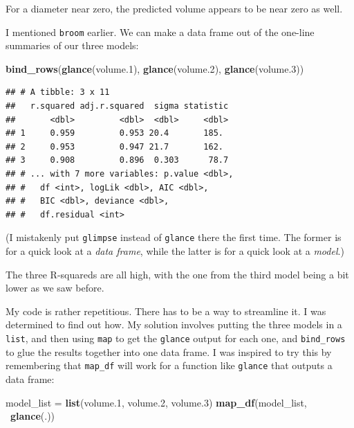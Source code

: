 \documentclass[]{tufte-book}
\newenvironment{Shaded}{}{}
\newcommand{\FloatTok}[1]{\textcolor[rgb]{0.25,0.63,0.44}{#1}}
\newcommand{\KeywordTok}[1]{\textcolor[rgb]{0.00,0.44,0.13}{\textbf{#1}}}
\newcommand{\NormalTok}[1]{#1}
\newcommand{\OperatorTok}[1]{\textcolor[rgb]{0.40,0.40,0.40}{#1}}
\newcommand{\StringTok}[1]{\textcolor[rgb]{0.25,0.44,0.63}{#1}}
\theoremstyle{definition}
\theoremstyle{definition}
\theoremstyle{definition}
\theoremstyle{remark}
\begin{document}
For a diameter near zero, the predicted volume appears to be near zero
as well.

I mentioned \texttt{broom} earlier. We can make a data frame out of the
one-line summaries of our three models:

\begin{Shaded}
\begin{Highlighting}[]
\KeywordTok{bind_rows}\NormalTok{(}\KeywordTok{glance}\NormalTok{(volume}\FloatTok{.1}\NormalTok{), }\KeywordTok{glance}\NormalTok{(volume}\FloatTok{.2}\NormalTok{), }
    \KeywordTok{glance}\NormalTok{(volume}\FloatTok{.3}\NormalTok{))}
\end{Highlighting}
\end{Shaded}

\begin{verbatim}
## # A tibble: 3 x 11
##   r.squared adj.r.squared  sigma statistic
##       <dbl>         <dbl>  <dbl>     <dbl>
## 1     0.959         0.953 20.4       185. 
## 2     0.953         0.947 21.7       162. 
## 3     0.908         0.896  0.303      78.7
## # ... with 7 more variables: p.value <dbl>,
## #   df <int>, logLik <dbl>, AIC <dbl>,
## #   BIC <dbl>, deviance <dbl>,
## #   df.residual <int>
\end{verbatim}

(I mistakenly put \texttt{glimpse} instead of \texttt{glance} there the
first time. The former is for a quick look at a \emph{data frame}, while
the latter is for a quick look at a \emph{model}.)

The three R-squareds are all high, with the one from the third model
being a bit lower as we saw before.

My code is rather repetitious. There has to be a way to streamline it. I
was determined to find out how. My solution involves putting the three
models in a \texttt{list}, and then using \texttt{map} to get the
\texttt{glance} output for each one, and \texttt{bind\_rows} to glue the
results together into one data frame. I was inspired to try this by
remembering that \texttt{map\_df} will work for a function like
\texttt{glance} that outputs a data frame:

\begin{Shaded}
\begin{Highlighting}[]
\NormalTok{model_list =}\StringTok{ }\KeywordTok{list}\NormalTok{(volume}\FloatTok{.1}\NormalTok{, volume}\FloatTok{.2}\NormalTok{, volume}\FloatTok{.3}\NormalTok{)}
\KeywordTok{map_df}\NormalTok{(model_list, }\OperatorTok{~}\KeywordTok{glance}\NormalTok{(.))}
\end{Highlighting}
\end{Shaded}
\end{document}
